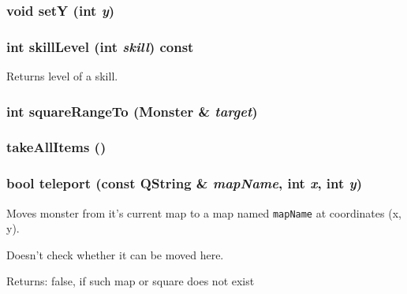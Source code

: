 \subsubsection{\setlength{\rightskip}{0pt plus 5cm}void set\-Y (int {\em y})}\label{classMonster_a39}


\subsubsection{\setlength{\rightskip}{0pt plus 5cm}int skill\-Level (int {\em skill}) const}\label{classMonster_a26}


Returns level of a skill. 

\subsubsection{\setlength{\rightskip}{0pt plus 5cm}int square\-Range\-To ({\bf Monster} \& {\em target})}\label{classMonster_a22}


\subsubsection{ take\-All\-Items ()}\label{classMonster_a23}


\subsubsection{\setlength{\rightskip}{0pt plus 5cm}bool teleport (const QString \& {\em map\-Name}, int {\em x}, int {\em y})\hspace{0.3cm}{\tt  [virtual]}}\label{classMonster_a32}


Moves monster from it's current map to a map named {\tt map\-Name} at coordinates (x, y). 

Doesn't check whether it can be moved here. \begin{Desc}
\item[Returns:]false, if such map or square does not exist\end{Desc}


